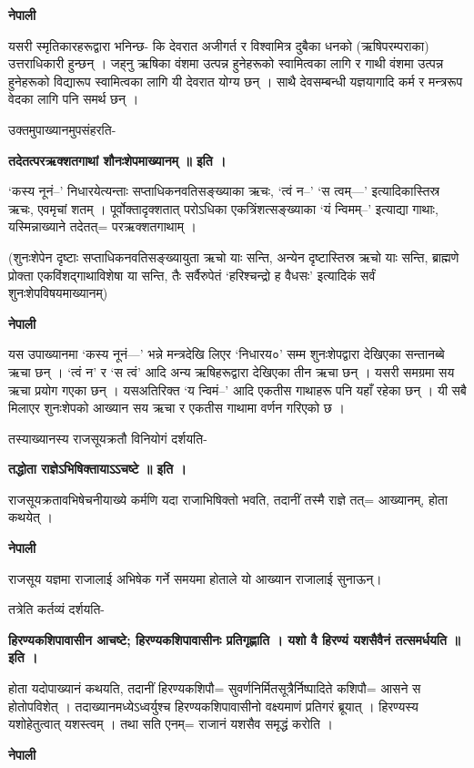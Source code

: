 \documentclass[11pt, a5paper]{article}
\begin{document}
\textbf{नेपाली}

यसरी स्मृतिकारहरूद्वारा भनिन्छ- कि देवरात अजीगर्त र विश्वामित्र दुबैका धनको (ऋषिपरम्पराका) उत्तराधिकारी हुन्छन् । जह्‌नु ऋषिका वंशमा उत्पन्न हुनेहरूको स्वामित्वका लागि र गाथी वंशमा उत्पन्न हुनेहरूको विद्यारूप स्वामित्वका लागि यी देवरात योग्य छन् । साथै  देवसम्बन्धी यज्ञयागादि कर्म र मन्त्ररूप वेदका लागि पनि समर्थ छन् ।

उक्तमुपाख्यानमुपसंहरति-

\textbf{तदेतत्परऋक्शतगाथां शौनःशेपमाख्यानम् ॥ इति ।}

‘कस्य नूनं–’ निधारयेत्यन्ताः सप्ताधिकनवतिसङ्‌ख्याका ऋचः, ‘त्वं न–’ ‘स त्वम्—’ इत्यादिकास्तिस्र ऋचः, एवमृचां शतम् । पूर्वोक्तादृक्शतात् परोऽधिका एकत्रिंशत्सङ्‌ख्याका ‘यं न्विमम्–’ इत्याद्या गाथाः, यस्मिन्नाख्याने तदेतत्= परऋक्शतगाथाम् ।

(शुनःशेपेन दृष्टाः सप्ताधिकनवतिसङ्‌ख्यायुता ऋचो याः सन्ति, अन्येन दृष्टास्तिस्र ऋचो याः सन्ति, ब्राह्मणे प्रोक्ता एकविंशद्‌गाथाविशेषा या सन्ति, तैः सर्वैरुपेतं ‘हरिश्चन्द्रो ह वैधसः’ इत्यादिकं सर्वं शुनःशेपविषयमाख्यानम्)

\textbf{नेपाली}

यस उपाख्यानमा ‘कस्य नूनं—’ भन्ने मन्त्रदेखि लिएर ‘निधारय०’ सम्म शुनःशेपद्वारा देखिएका सन्तानब्बे ऋचा छन् । ‘त्वं न’ र ‘स त्वं’ आदि अन्य ऋषिहरूद्वारा देखिएका तीन ऋचा छन् । यसरी समग्रमा सय ऋचा प्रयोग गएका छन् । यसअतिरिक्त ‘य न्विमं–’ आदि एकतीस गाथाहरू पनि यहाँ रहेका छन् । यी सबै मिलाएर शुनःशेपको आख्यान सय ऋचा र एकतीस गाथामा वर्णन गरिएको छ ।

तस्याख्यानस्य राजसूयक्रतौ विनियोगं दर्शयति-

\textbf{तद्धोता राज्ञेऽभिषिक्तायाऽऽचष्टे ॥ इति ।}

राजसूयक्रतावभिषेचनीयाख्ये कर्मणि यदा राजाभिषिक्तो भवति, तदानीं तस्मै राज्ञे तत्= आख्यानम्, होता कथयेत् ।

\textbf{नेपाली}

राजसूय यज्ञमा राजालाई अभिषेक गर्ने समयमा होताले यो आख्यान राजालाई सुनाऊन्।

तत्रेति कर्तव्यं दर्शयति-

\textbf{हिरण्यकशिपावासीन आचष्टे; हिरण्यकशिपावासीनः प्रतिगृह्णाति । यशो वै हिरण्यं यशसैवैनं तत्समर्धयति ॥ इति ।}

होता यदोपाख्यानं कथयति, तदानीं हिरण्यकशिपौ= सुवर्णनिर्मितसूत्रैर्निष्पादिते कशिपौ= आसने स होतोपविशेत् । तदाख्यानमध्येऽध्वर्युश्च हिरण्यकशिपावासीनो वक्ष्यमाणं प्रतिगरं ब्रूयात् । हिरण्यस्य यशोहेतुत्वात् यशस्त्वम् । तथा सति एनम्= राजानं  यशसैव समृद्धं करोति ।

\textbf{नेपाली}
\end{document}
